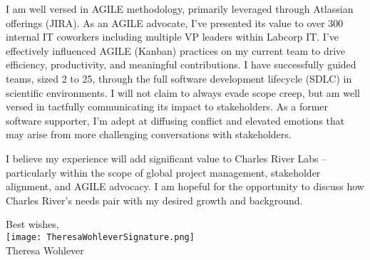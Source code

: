 \documentclass[10pt,letterpaper]{article}
\begin{document}
\begin{flushleft}
I am well versed in AGILE methodology, primarily leveraged through Atlassian offerings (JIRA). As an AGILE advocate, I've presented its value to over 300 internal IT coworkers including multiple VP leaders within Labcorp IT. I've effectively influenced AGILE (Kanban) practices on my current team to drive efficiency, productivity, and meaningful contributions. I have successfully guided teams, sized 2 to 25, through the full software development lifecycle (SDLC) in scientific environments. I will not claim to always evade scope creep, but am well versed in tactfully communicating its impact to stakeholders. As a former software supporter, I’m adept at diffusing conflict and elevated emotions that may arise from more challenging conversations with stakeholders.

I believe my experience will add significant value to Charles River Labs – particularly within the scope of global project management, stakeholder alignment, and AGILE advocacy. I am hopeful for the opportunity to discuss how Charles River’s needs pair with my desired growth and background.
\end{flushleft}


\hspace*{.6\linewidth} Best wishes, \\
\hspace*{.57\linewidth} \texttt{[image: TheresaWohleverSignature.png]}  {\vspace{-9pt}} \\
\hspace*{.6\linewidth}  Theresa Wohlever
\end{document}

